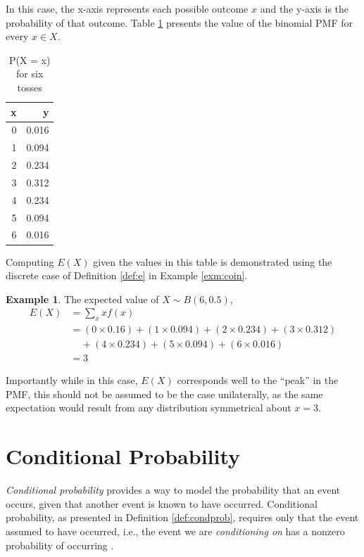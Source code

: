 \documentclass[
  12pt,
  oneside]{book}
\theoremstyle{definition}
\theoremstyle{definition}
\newtheorem{example}{Example}[chapter]
\theoremstyle{definition}
\theoremstyle{remark}
\begin{document}
In this case, the x-axis represents each possible outcome \(x\) and the y-axis is the probability of that outcome. Table \ref{tab:bino} presents the value of the binomial PMF for every \(x \in X\).

\begin{table}[!h]

\caption{\label{tab:bino}P(X = x) for six tosses}
\centering
\begin{tabular}[t]{rr}
\toprule
x & y\\
\midrule
0 & 0.016\\
1 & 0.094\\
2 & 0.234\\
3 & 0.312\\
4 & 0.234\\
5 & 0.094\\
6 & 0.016\\
\bottomrule
\end{tabular}
\end{table}

Computing \(E(X)\) given the values in this table is demonstrated using the discrete case of Definition \ref{def:e} in Example \ref{exm:coin}.

\begin{example}
\protect\hypertarget{exm:coin}{}{\label{exm:coin} }The expected value of \(X \sim B(6, 0.5)\),
\[\begin{split}
E(X) & = \sum_{x}xf(x) \\
  & =  (0 \times 0.16)+(1 \times 0.094)+(2 \times 0.234)+(3 \times 0.312)\\
  & \;\;\;\; +(4 \times 0.234)+(5 \times 0.094)+(6 \times 0.016)\\
  & = 3
\end{split}\]
\end{example}

Importantly while in this case, \(E(X)\) corresponds well to the ``peak'' in the PMF, this should not be assumed to be the case unilaterally, as the same expectation would result from any distribution symmetrical about \(x=3\).

\hypertarget{conditional-probability}{%
\section{Conditional Probability}\label{conditional-probability}}

\emph{Conditional probability} provides a way to model the probability that an event occurs, given that another event is known to have occurred.
Conditional probability, as presented in Definition \ref{def:condprob}, requires only that the event assumed to have occurred, i.e., the event we are \emph{conditioning on} has a nonzero probability of occurring \citep[  3.5]{Wasserman2004}.
\end{document}
